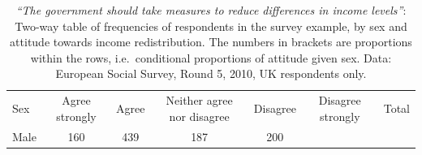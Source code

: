 \documentclass[11pt,a4paper,openany]{book}
\begin{document}
\begin{longtable}[]{@{}lcccccc@{}}
\caption{\label{tab:t-sex-attitude-row} \emph{``The government should take
measures to reduce differences in income levels''}: Two-way table of
frequencies of respondents in the survey example, by sex and attitude
towards income redistribution. The numbers in brackets are proportions
within the rows, i.e.~conditional proportions of attitude given sex.
Data: European Social Survey, Round 5, 2010, UK respondents
only.}\tabularnewline
\toprule
\begin{minipage}[t]{0.13\columnwidth}\raggedright\strut
Sex\strut
\end{minipage} & \begin{minipage}[t]{0.15\columnwidth}\centering\strut
Agree strongly\strut
\end{minipage} & \begin{minipage}[t]{0.09\columnwidth}\centering\strut
Agree\strut
\end{minipage} & \begin{minipage}[t]{0.15\columnwidth}\centering\strut
Neither agree nor disagree\strut
\end{minipage} & \begin{minipage}[t]{0.10\columnwidth}\centering\strut
Disagree\strut
\end{minipage} & \begin{minipage}[t]{0.10\columnwidth}\centering\strut
Disagree strongly\strut
\end{minipage} & \begin{minipage}[t]{0.07\columnwidth}\centering\strut
Total\strut
\end{minipage}\tabularnewline
\begin{minipage}[t]{0.13\columnwidth}\raggedright\strut
Male\strut
\end{minipage} & \begin{minipage}[t]{0.15\columnwidth}\centering\strut
160\strut
\end{minipage} & \begin{minipage}[t]{0.09\columnwidth}\centering\strut
439\strut
\end{minipage} & \begin{minipage}[t]{0.15\columnwidth}\centering\strut
187\strut
\end{minipage} & \begin{minipage}[t]{0.10\columnwidth}\centering\strut
200\strut
\end{minipage} & \begin{minipage}[t]{0.10\columnwidth}\centering\strut

\end{minipage}
\end{longtable}
\end{document}

